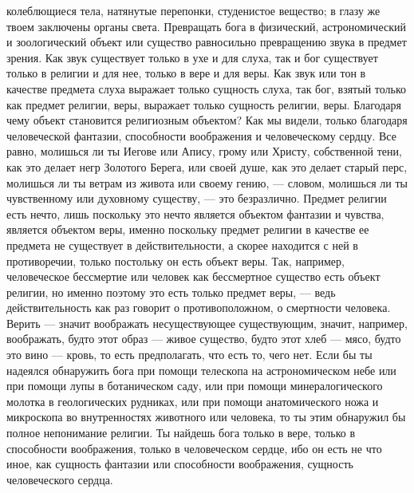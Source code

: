 \documentclass[12pt]{article}
\begin{document}
колеблющиеся тела, натянутые перепонки, студенистое вещество; в глазу же твоем заключены органы света. Превращать бога в физический, астрономический и зоологический объект или существо равносильно превращению звука в предмет зрения. Как звук существует только в ухе и для слуха, так и бог существует только в религии и для нее, только в вере и для веры. Как звук или тон в качестве предмета слуха выражает только сущность слуха, так бог, взятый только как предмет религии, веры, выражает только сущность религии, веры. Благодаря чему объект становится религиозным объектом? Как мы видели, только благодаря человеческой фантазии, способности воображения и человеческому сердцу. Все равно, молишься ли ты Иегове или Апису, грому или Христу, собственной тени, как это делает негр Золотого Берега, или своей душе, как это делает старый перс, молишься ли ты ветрам из живота или своему гению, --- словом, молишься ли ты чувственному или духовному существу, --- это безразлично. Предмет религии есть нечто, лишь поскольку это нечто является объектом фантазии и чувства, является объектом веры, именно поскольку предмет религии в качестве ее предмета не существует в действительности, а скорее находится с ней в противоречии, только постольку он есть объект веры. Так, например, человеческое бессмертие или человек как бессмертное существо есть объект религии, но именно поэтому это есть только предмет веры, --- ведь действительность как раз говорит о противоположном, о смертности человека. Верить --- значит воображать несуществующее существующим, значит, например, воображать, будто этот образ --- живое существо, будто этот хлеб --- мясо, будто это вино --- кровь, то есть предполагать, что есть то, чего нет. Если бы ты надеялся обнаружить бога при помощи телескопа на астрономическом небе или при помощи лупы в ботаническом саду, или при помощи минералогического молотка в геологических рудниках, или при помощи анатомического ножа и микроскопа во внутренностях животного или человека, то ты этим обнаружил бы полное непонимание религии. Ты найдешь бога только в вере, только в способности воображения, только в человеческом сердце, ибо он есть не что иное, как сущность фантазии или способности воображения, сущность человеческого сердца.


\section{}
\end{document}
